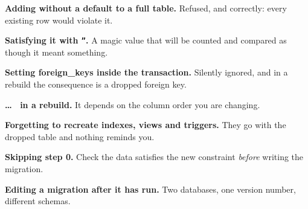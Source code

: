 \begin{pitfall}
\begin{tight}
  \item \textbf{Adding  without a default to a full table.}
        Refused, and correctly: every existing row would violate it.
  \item \textbf{Satisfying it with  \texttt{''}.} A magic value
        that will be counted and compared as though it meant something.
  \item \textbf{Setting  foreign\_keys inside the transaction.}
        Silently ignored, and in a rebuild the consequence is a dropped
        foreign key.
  \item \textbf{ \dots\  in a rebuild.} It
        depends on the column order you are changing.
  \item \textbf{Forgetting to recreate indexes, views and triggers.} They go
        with the dropped table and nothing reminds you.
  \item \textbf{Skipping step 0.} Check the data satisfies the new constraint
        \emph{before} writing the migration.
  \item \textbf{Editing a migration after it has run.} Two databases, one
        version number, different schemas.
\end{tight}
\end{pitfall}

